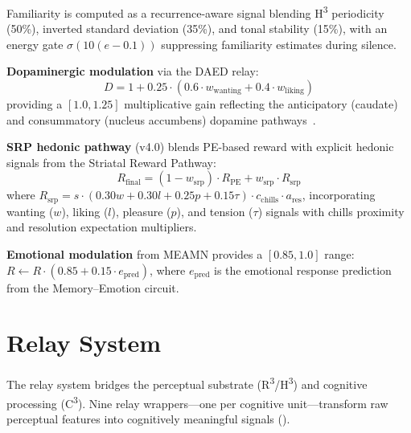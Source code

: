\documentclass[10pt,twocolumn]{article}
\newcommand{\Rcube}{R\textsuperscript{3}}
\newcommand{\Hcube}{H\textsuperscript{3}}
\newcommand{\Ccube}{C\textsuperscript{3}}
\newcommand{\pe}{\mathrm{PE}}
\begin{document}
Familiarity is computed as a recurrence-aware signal blending \Hcube{} periodicity (50\%), inverted standard deviation (35\%), and tonal stability (15\%), with an energy gate $\sigma(10(e - 0.1))$ suppressing familiarity estimates during silence.

\textbf{Dopaminergic modulation} via the DAED relay:
\begin{equation}
D = 1 + 0.25 \cdot (0.6 \cdot w_{\text{wanting}} + 0.4 \cdot w_{\text{liking}})
\label{eq:dagain}
\end{equation}
providing a $[1.0, 1.25]$ multiplicative gain reflecting the anticipatory (caudate) and consummatory (nucleus accumbens) dopamine pathways~\cite{salimpoor2011}.

\textbf{SRP hedonic pathway} (v4.0) blends PE-based reward with explicit hedonic signals from the Striatal Reward Pathway:
\begin{equation}
R_{\text{final}} = (1 - w_{\text{srp}}) \cdot R_{\pe} + w_{\text{srp}} \cdot R_{\text{srp}}
\end{equation}
where $R_{\text{srp}} = s \cdot (0.30 w + 0.30 l + 0.25 p + 0.15 \tau) \cdot c_{\text{chills}} \cdot a_{\text{res}}$, incorporating wanting ($w$), liking ($l$), pleasure ($p$), and tension ($\tau$) signals with chills proximity and resolution expectation multipliers.

\textbf{Emotional modulation} from MEAMN provides a $[0.85, 1.0]$ range:
$R \leftarrow R \cdot (0.85 + 0.15 \cdot e_{\text{pred}})$, where $e_{\text{pred}}$ is the emotional response prediction from the Memory--Emotion circuit.

\section{Relay System}
\label{sec:relay}

The relay system bridges the perceptual substrate (\Rcube{}/\Hcube{}) and cognitive processing (\Ccube{}).
Nine relay wrappers---one per cognitive unit---transform raw perceptual features into cognitively meaningful signals ().
\end{document}
